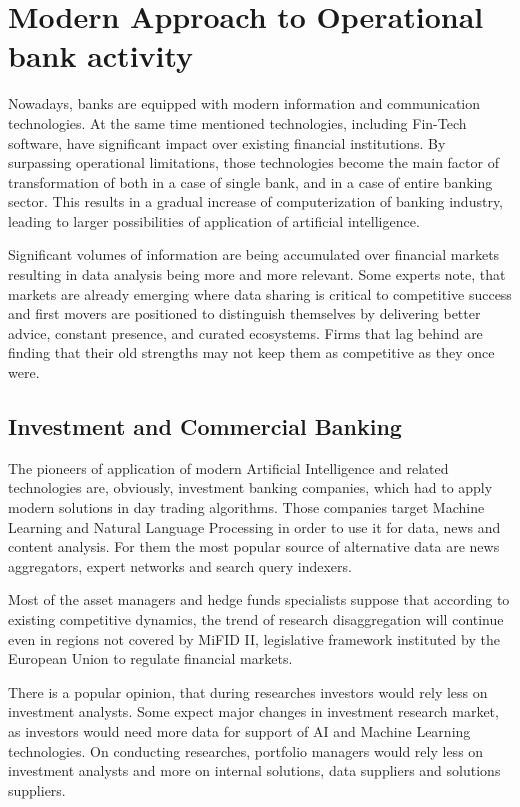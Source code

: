 

\section{Modern Approach to Operational bank activity}

Nowadays, banks are equipped with modern information and communication technologies.
At the same time mentioned technologies, including Fin-Tech software, have significant impact over existing financial institutions.
By surpassing operational limitations, those technologies become the main factor of transformation of both in a case of single bank, and in a case of entire banking sector. 
This results in a gradual increase of computerization of banking industry, leading to larger possibilities of application of artificial intelligence.

Significant volumes of information are being accumulated over financial markets resulting in data analysis being more and more relevant.
Some experts note, that markets are already emerging where data sharing is critical to competitive success and first movers are positioned to distinguish themselves by delivering better advice, constant presence, and curated ecosystems. 
Firms that lag behind are finding that their old strengths may not keep them as competitive as they once were.
\cite{ai_transform_disrupt}


\subsection{Investment and Commercial Banking}

The pioneers of application of modern Artificial Intelligence and related technologies are, obviously, investment banking companies, which had to apply modern solutions in day trading algorithms. 
Those companies target Machine Learning and Natural Language Processing in order to use it for data, news and content analysis.
For them the most popular source of alternative data are news aggregators, expert networks and search query indexers.

Most of the asset managers and hedge funds specialists suppose that according to existing competitive dynamics, the trend of research disaggregation will continue even in regions not covered by MiFID II, legislative framework instituted by the European Union to regulate financial markets.

There is a popular opinion, that during researches investors would rely less on investment analysts. 
Some expect major changes in investment research market, as investors would need more data for support of AI and Machine Learning technologies.
On conducting researches, portfolio managers would rely less on investment analysts and more on internal solutions, data suppliers and solutions suppliers.
\cite{future_of_trading_technology_2024}


